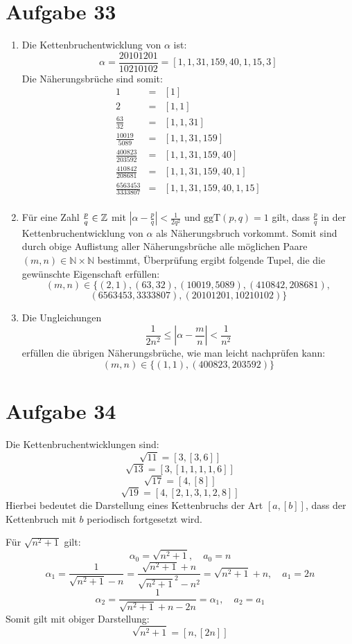 \section*{Aufgabe 33}
\begin{enumerate}[(1)]
	\item Die Kettenbruchentwicklung von $\alpha$ ist:
	\[ \alpha = \frac{20101201}{10210102} = [ 1, 1, 31, 159, 40, 1, 15, 3 ] \]
	Die Näherungsbrüche sind somit:
	\begin{eqnarray*}
	1 &=& [1] \\
	2 &=& [1, 1] \\
	\frac{63}{32} &=& [1,1,31] \\
	\frac{10019 }{5089} &=& [1,1,31,159] \\
	\frac{400823}{203592} &=& [1,1,31,159,40] \\
	\frac{410842}{208681} &=& [1,1,31,159,40,1] \\
	\frac{6563453}{3333807} &=& [1,1,31,159,40,1,15] \\
	\end{eqnarray*}
		
	\item Für eine Zahl $\frac{p}{q} \in \mathbb{Z}$ mit $\left| \alpha -
	\frac{p}{q} \right| < \frac{1}{2 q^2}$ und $\text{ggT}(p,q) = 1$ gilt, dass
	$\frac{p}{q}$ in der Kettenbruchentwicklung von $\alpha$ als
	Näherungsbruch vorkommt.
	Somit sind durch obige Auflistung aller Näherungsbrüche alle möglichen Paare $(m,n) \in \mathbb{N} \times \mathbb{N}$ bestimmt, Überprüfung ergibt folgende Tupel, die die gewünschte Eigenschaft erfüllen:
	\[ (m,n) \in \{ (2,1), (63,32), (10019, 5089), (410842 ,208681 ), \]
	\[ (6563453 ,3333807 ), (20101201 ,10210102 )\} \]

	\item Die Ungleichungen 
	\[ \frac{1}{2 n^2} \leq \left| \alpha - \frac{m}{n} \right| < \frac{1}{n^2} \]
	erfüllen die übrigen Näherungsbrüche, wie man leicht nachprüfen kann:
	\[ (m,n) \in \{(1,1), (400823, 203592)\} \]
\end{enumerate}


\section*{Aufgabe 34}
Die Kettenbruchentwicklungen sind:
\[ \sqrt{11} = [3, [3, 6]] \]
\[ \sqrt{13} = [3, [1, 1, 1, 1, 6]] \]
\[ \sqrt{17} = [4, [8]] \]
\[ \sqrt{19} = [4, [2, 1, 3, 1, 2, 8]] \]
Hierbei bedeutet die Darstellung eines Kettenbruchs der Art $[a, [b]]$, dass
der Kettenbruch mit $b$ periodisch fortgesetzt wird.

Für $\sqrt{n^2 + 1}$ gilt:
\[ \alpha_0 = \sqrt{n^2 + 1}, \quad a_0 = n \]
\[ \alpha_1 = \frac{1}{\sqrt{n^2 + 1} - n} = \frac{\sqrt{n^2 + 1} + n}{{\sqrt{n^2 + 1}}^2 - n^2} = \sqrt{n^2 + 1} + n, \quad a_1 = 2n \]
\[ \alpha_2 = \frac{1}{\sqrt{n^2 + 1} + n - 2n} = \alpha_1, \quad a_2 = a_1 \]
Somit gilt mit obiger Darstellung:
\[ \sqrt{n^2 + 1} = [n, [2n]] \]
